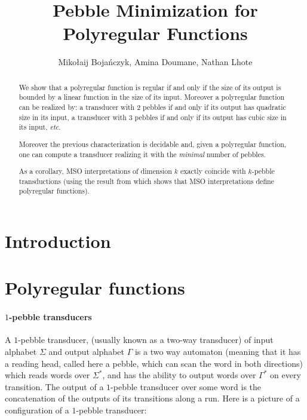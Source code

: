 \documentclass{article}
\newcommand{\mso}{\textsf{MSO}\xspace}
\theoremstyle{definition}
\theoremstyle{remark}
\begin{document}
 \title{Pebble Minimization for Polyregular Functions}
 \author{Miko\l aij Boja\' nczyk, Amina Doumane, Nathan Lhote}
 \date{}
 \maketitle

\begin{abstract}
We show that a polyregular function is regular if and only if the size of its output is bounded by a linear function in the size of its input. Moreover a polyregular function can be realized by: a transducer with 2 pebbles if and only if its output has quadratic size in its input, a transducer with 3 pebbles if and only if its output has cubic size in its input, \textit{etc}.

Moreover the previous characterization is decidable and, given a polyregular function, one can compute a transducer realizing it with the \emph{minimal} number of pebbles.

As a corollary, \mso interpretations of dimension $k$ exactly coincide with $k$-pebble transductions (using the result from \cite{BojanczykKL19} which shows that \mso interpretations define polyregular functions).

\end{abstract}
\tableofcontents

\section*{Introduction}



\section{Polyregular functions}

\paragraph{$1$-pebble transducers}
A $1$-pebble transducer, (usually known as a two-way transducer) of input alphabet $\Sigma$ and output alphabet $\Gamma$ is a two way automaton (meaning that it has a reading head, called here a pebble, which can scan the word in both directions) which reads words over $\Sigma^*$, and has the ability to output words over $\Gamma^*$ on every transition. 
The output of a $1$-pebble transducer over some word is the concatenation of the outputs of its transitions along a run.
Here is a picture of a configuration of a $1$-pebble transducer:
\end{document}
